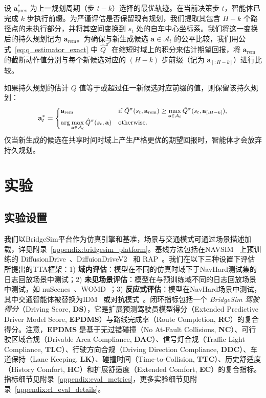 \documentclass{article}
\begin{document}
设 $\mathbf{a}^*_{\mathrm{prev}}$ 为上一规划周期（步 $t-k$）选择的最优轨迹。在当前决策步 $t$，智能体已完成 $k$ 步执行前缀。为严谨评估是否保留现有规划，我们提取其包含 $H-k$ 个路径点的未执行部分，并将其空间变换到 $s_t$ 处的自车中心坐标系。我们将这一变换后的持久规划记为 $\mathbf{a}_{\mathrm{rem}}$。为确保与新生成候选 $\mathbf{a} \in \mathcal{A}_t$ 的公平比较，我们用公式~\ref{eq:q_estimator_exact} 中 $\hat{Q}^{\pi}$ 在缩短时域上的积分来估计期望回报，将 $\mathbf{a}_{\mathrm{rem}}$ 的截断动作值分别与每个新候选对应的 $(H-k)$ 步前缀（记为 $\mathbf{a}_{[:H-k]}$）进行比较。

如果持久规划的估计 $Q$ 值等于或超过任一新候选对应前缀的值，则保留该持久规划：
\begin{equation}
\small
    \mathbf{a}_t^* =
    \begin{cases}
        \mathbf{a}_{\mathrm{rem}} & \text{if } \hat{Q}^{\pi}(s_t, \mathbf{a}_{\mathrm{rem}}) \ge \max\limits_{\mathbf{a} \in \mathcal{A}_t} \hat{Q}^{\pi}(s_t, \mathbf{a}_{[:H-k]}), \\
        \arg\max\limits_{\mathbf{a} \in \mathcal{A}_t} \hat{Q}^{\pi}(s_t, \mathbf{a}) & \text{otherwise}.
    \end{cases}
\end{equation}
仅当新生成的候选在共享时间时域上产生严格更优的期望回报时，智能体才会放弃持久规划。

\section{实验}
\label{section:experiments}

\subsection{实验设置}
我们以BridgeSim平台作为仿真引擎和基准，场景与交通模式可通过场景描述加载，详见附录~\ref{appendix:bridgesim_platform}。基线方法包括在NAVSIM~\cite{navsimv2} 上预训练的 DiffusionDrive~\cite{diffusiondrive}、DiffuionDriveV2~\cite{diffusiondrivev2} 和 RAP~\cite{RAP}。我们在以下三种设置下评估所提出的TTA框架：1) \textbf{域内评估}：模型在不同的仿真时域下于NavHard测试集的日志回放场景中测试；2) \textbf{未见场景评估}：模型在与预训练域不同的日志回放场景中测试，如 nuScenes~\cite{caesar2020nuscenes}、WOMD~\cite{mei2022waymo}；3) \textbf{反应式评估}：模型在NavHard场景中测试，其中交通智能体被替换为IDM~\cite{idm} 或对抗模式~\cite{advbmt}。闭环指标包括一个 \textit{BridgeSim 驾驶得分}（Driving Score, \textbf{DS}），它是扩展预测驾驶员模型得分（Extended Predictive Driver Model Score, \textbf{EPDMS}）与路线完成率（Route Completion, \textbf{RC}）的复合得分。注意，\textbf{EPDMS} 是基于无过错碰撞（No At-Fault Collisions, \textbf{NC}）、可行驶区域合规（Drivable Area Compliance, \textbf{DAC}）、信号灯合规（Traffic Light Compliance, \textbf{TLC}）、行驶方向合规（Driving Direction Compliance, \textbf{DDC}）、车道保持（Lane Keeping, \textbf{LK}）、碰撞时间（Time-to-Collision, \textbf{TTC}）、历史舒适度（History Comfort, \textbf{HC}）和扩展舒适度（Extended Comfort, \textbf{EC}）的复合指标。指标细节见附录~\ref{appendix:eval_metrics}，更多实验细节见附录~\ref{appendix:cl_eval_details}。
\end{document}
